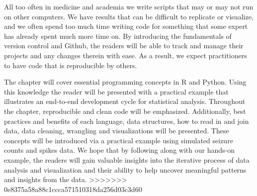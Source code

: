 All too often in medicine and academia we write scripts that may or may not run on other computers. We have results that can be difficult to replicate or visualize, and we often spend too much time writing code for something that some expert has already spent much more time on. By introducing the fundamentals of version control and Github, the readers will be able to track and manage their projects and any changes therein with ease. As a result, we expect practitioners to have code that is reproducible by others.

The chapter will cover essential programming concepts in R and Python. Using this knowledge the reader will be presented with a practical example that illustrates an end-to-end development cycle for statistical analysis. Throughout the chapter, reproducible and clean code will be emphasized. Additionally, best practices and benefits of each language, data structures, how to read in and join data, data cleaning, wrangling and visualizations will be presented. These concepts will be introduced via a practical example using simulated seizure counts and spikes data. We hope that by following along with our hands-on example, the readers will gain valuable insights into the iterative process of data analysis and visualization and their ability to help uncover meaningful patterns and insights from the data.
>>>>>>> 0e8375a58a88c1ccca571510318da256d03c3d60
